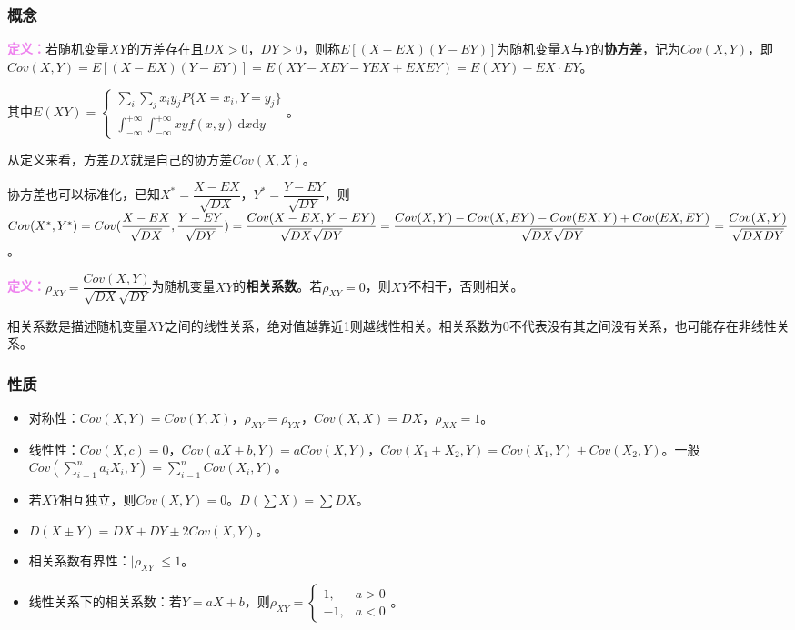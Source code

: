 \subsubsection{概念}

\textcolor{violet}{\textbf{定义：}}若随机变量$XY$的方差存在且$DX>0$，$DY>0$，则称$E[(X-EX)(Y-EY)]$为随机变量$X$与$Y$的\textbf{协方差}，记为$Cov(X,Y)$，即$Cov(X,Y)=E[(X-EX)(Y-EY)]=E(XY-XEY-YEX+EXEY)=E(XY)-EX\cdot EY$。

其中$E(XY)=\left\{\begin{array}{l}
    \sum\limits_i\sum\limits_jx_iy_jP\{X=x_i,Y=y_j\} \\
    \int_{-\infty}^{+\infty}\int_{-\infty}^{+\infty}xyf(x,y)\,\textrm{d}x\textrm{d}y
\end{array}\right.$。

从定义来看，方差$DX$就是自己的协方差$Cov(X,X)$。

协方差也可以标准化，已知$X^*=\dfrac{X-EX}{\sqrt{DX}}$，$Y^*=\dfrac{Y-EY}{\sqrt{DY}}$，则$Cov(X^*,Y^*)\\=Cov(\dfrac{X-EX}{\sqrt{DX}},\dfrac{Y-EY}{\sqrt{DY}})=\dfrac{Cov(X-EX,Y-EY)}{\sqrt{DX}\sqrt{DY}}\\=\dfrac{Cov(X,Y)-Cov(X,EY)-Cov(EX,Y)+Cov(EX,EY)}{\sqrt{DX}\sqrt{DY}}=\dfrac{Cov(X,Y)}{\sqrt{DXDY}}$。

\textcolor{violet}{\textbf{定义：}}$\rho_{XY}=\dfrac{Cov(X,Y)}{\sqrt{DX}\sqrt{DY}}$为随机变量$XY$的\textbf{相关系数}。若$\rho_{XY}=0$，则$XY$不相干，否则相关。

相关系数是描述随机变量$XY$之间的线性关系，绝对值越靠近1则越线性相关。相关系数为0不代表没有其之间没有关系，也可能存在非线性关系。

\subsubsection{性质}

\begin{itemize}
    \item 对称性：$Cov(X,Y)=Cov(Y,X)$，$\rho_{XY}=\rho_{YX}$，$Cov(X,X)=DX$，$\rho_{XX}=1$。
    \item 线性性：$Cov(X,c)=0$，$Cov(aX+b,Y)=aCov(X,Y)$，$Cov(X_1+X_2,Y)=Cov(X_1,Y)+Cov(X_2,Y)$。一般$Cov\left(\sum\limits_{i=1}^na_iX_i,Y\right)=\sum\limits_{i=1}^nCov(X_i,Y)$。
    \item 若$XY$相互独立，则$Cov(X,Y)=0$。$D(\sum X)=\sum DX$。
    \item $D(X\pm Y)=DX+DY\pm2Cov(X,Y)$。
    \item 相关系数有界性：$\vert\rho_{XY}\vert\leqslant1$。
    \item 线性关系下的相关系数：若$Y=aX+b$，则$\rho_{XY}=\left\{\begin{array}{ll}
        1, & a>0 \\
        -1, & a<0
    \end{array}\right.$。
\end{itemize}

